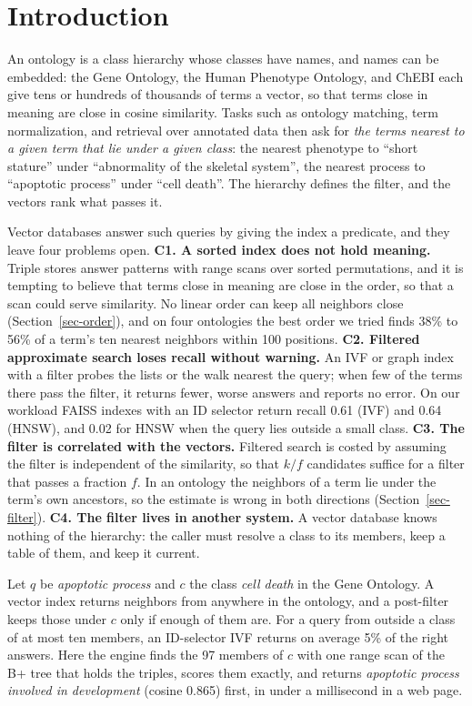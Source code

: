\section{Introduction}
\label{sec-intro}

An ontology is a class hierarchy whose classes have names, and names can be
embedded: the Gene Ontology, the Human Phenotype Ontology, and ChEBI each give tens
or hundreds of thousands of terms a vector, so that terms close in meaning are close
in cosine similarity.
Tasks such as ontology matching, term normalization, and retrieval over annotated
data then ask for \emph{the terms nearest to a given term that lie under a given
class}: the nearest phenotype to ``short stature'' under ``abnormality of the
skeletal system'', the nearest process to ``apoptotic process'' under ``cell
death''.
The hierarchy defines the filter, and the vectors rank what passes it.

Vector databases answer such queries by giving the index a predicate, and they leave
four problems open.
\textbf{C1. A sorted index does not hold meaning.}
Triple stores answer patterns with range scans over sorted permutations, and it is
tempting to believe that terms close in meaning are close in the order, so that a
scan could serve similarity.
No linear order can keep all neighbors close (Section~\ref{sec-order}), and on four
ontologies the best order we tried finds 38\% to 56\% of a term's ten nearest
neighbors within 100 positions.
\textbf{C2. Filtered approximate search loses recall without warning.}
An IVF or graph index with a filter probes the lists or the walk nearest the query;
when few of the terms there pass the filter, it returns fewer, worse answers and
reports no error.
On our workload FAISS indexes with an ID selector return recall 0.61 (IVF) and 0.64
(HNSW), and 0.02 for HNSW when the query lies outside a small class.
\textbf{C3. The filter is correlated with the vectors.}
Filtered search is costed by assuming the filter is independent of the similarity,
so that $k/f$ candidates suffice for a filter that passes a fraction $f$.
In an ontology the neighbors of a term lie under the term's own ancestors, so the
estimate is wrong in both directions (Section~\ref{sec-filter}).
\textbf{C4. The filter lives in another system.}
A vector database knows nothing of the hierarchy: the caller must resolve a class to
its members, keep a table of them, and keep it current.

\begin{example}
\label{exa-motivation}
Let $q$ be \emph{apoptotic process} and $c$ the class \emph{cell death} in the Gene
Ontology.
A vector index returns neighbors from anywhere in the ontology, and a post-filter
keeps those under $c$ only if enough of them are.
For a query from outside a class of at most ten members, an ID-selector IVF returns
on average 5\% of the right answers.
Here the engine finds the 97 members of $c$ with one range scan of the B+ tree that
holds the triples, scores them exactly, and returns \emph{apoptotic process involved
in development} (cosine 0.865) first, in under a millisecond in a web page.
\end{example}

